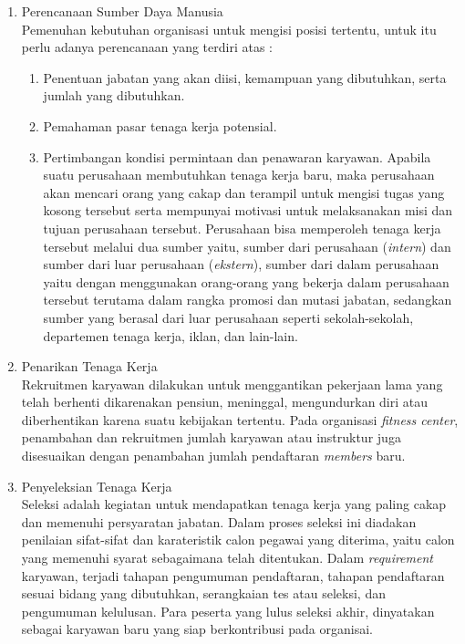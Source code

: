 \begin{enumerate}

\item Perencanaan Sumber Daya Manusia \\
Pemenuhan kebutuhan organisasi untuk mengisi posisi tertentu, untuk itu perlu adanya perencanaan yang terdiri atas :

\begin{enumerate}

\item Penentuan jabatan yang akan diisi, kemampuan yang dibutuhkan, serta jumlah yang dibutuhkan.

\item Pemahaman pasar tenaga kerja potensial.

\item Pertimbangan kondisi permintaan dan penawaran karyawan. Apabila suatu perusahaan membutuhkan tenaga kerja baru, maka perusahaan akan mencari orang yang cakap dan terampil untuk mengisi tugas yang kosong tersebut serta mempunyai motivasi untuk melaksanakan misi dan tujuan perusahaan tersebut. Perusahaan bisa memperoleh tenaga kerja tersebut melalui dua sumber yaitu, sumber dari perusahaan (\textit{intern}) dan sumber dari luar perusahaan (\textit{ekstern}), sumber dari dalam perusahaan yaitu dengan menggunakan orang-orang yang bekerja dalam perusahaan tersebut terutama dalam rangka promosi dan mutasi jabatan, sedangkan sumber yang berasal dari luar perusahaan seperti sekolah-sekolah, departemen tenaga kerja, iklan, dan lain-lain.

\end{enumerate}

\item Penarikan Tenaga Kerja \\
Rekruitmen karyawan dilakukan untuk menggantikan pekerjaan lama yang telah berhenti dikarenakan pensiun, meninggal, mengundurkan diri atau diberhentikan karena suatu kebijakan tertentu. Pada organisasi \textit{fitness center}, penambahan dan rekruitmen jumlah karyawan atau instruktur juga disesuaikan dengan penambahan jumlah pendaftaran \textit{members} baru.

\item Penyeleksian Tenaga Kerja \\ 
Seleksi adalah kegiatan untuk mendapatkan tenaga kerja yang paling cakap dan memenuhi persyaratan jabatan. Dalam proses seleksi ini diadakan penilaian sifat-sifat dan karateristik calon pegawai yang diterima, yaitu calon yang memenuhi syarat sebagaimana telah ditentukan. Dalam \textit{requirement} karyawan, terjadi tahapan pengumuman pendaftaran, tahapan pendaftaran sesuai bidang yang dibutuhkan, serangkaian tes atau seleksi, dan pengumuman kelulusan. Para peserta yang lulus seleksi akhir, dinyatakan sebagai karyawan baru yang siap berkontribusi pada organisai. 


\end{enumerate}
